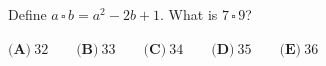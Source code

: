 Define $a\,\square\,b=a^2-2b+1$. What is $7\,\square\,9$?

$\textbf{(A)}\ 32\qquad\textbf{(B)}\ 33\qquad\textbf{(C)}\ 34\qquad\textbf{(D)}\ 35\qquad\textbf{(E)}\ 36$
